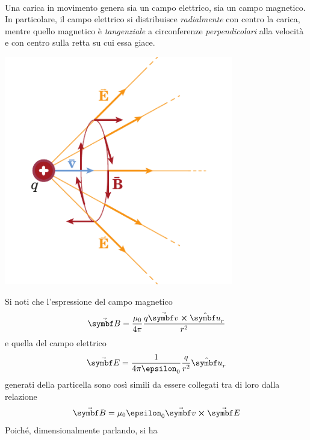 \begin{observe}~\\
	\begin{minipage}{0.75\textwidth}
		Una carica in movimento genera sia un campo elettrico, sia un campo magnetico. In particolare, il campo elettrico si distribuisce \textit{radialmente} con centro la carica, mentre quello magnetico è \textit{tangenziale} a circonferenze \textit{perpendicolari} alla velocità e con centro sulla retta su cui essa giace.
	\end{minipage}\hspace{5pt}
	\begin{minipage}{0.24\textwidth}
			\begin{center}
			\includegraphics[width=0.75\textwidth]{images/chp8/chp8campomagneticoelettrico.pdf}
		\end{center}
	\end{minipage}
\end{observe}
Si noti che l'espressione del campo magnetico
\begin{equation*}
	\vba{B}=\frac{\mu_0}{4\pi}\frac{q\vba{v}\cross\vbh{u}_r}{r^2}
\end{equation*}
e quella del campo elettrico
\begin{equation*}
	\vba{E}=\frac{1}{4\pi\epsilon_0}\frac{q}{r^2}\vbh{u}_r
\end{equation*}
generati della particella sono così simili da essere collegati tra di loro dalla relazione
\begin{equation}
	\vba{B}=\mu_0\epsilon_0\vba{v}\cross\vba{E}
\end{equation}
Poiché, dimensionalmente parlando, si ha
